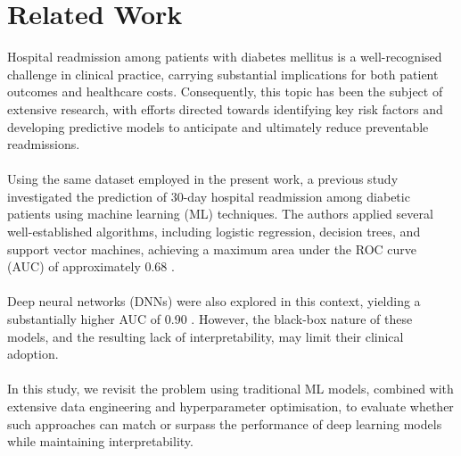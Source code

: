 \section{Related Work}

Hospital readmission among patients with diabetes mellitus is a well-recognised challenge in clinical practice, carrying substantial implications for both patient outcomes and healthcare costs. Consequently, this topic has been the subject of extensive research, with efforts directed towards identifying key risk factors and developing predictive models to anticipate and ultimately reduce preventable readmissions.\\\\
Using the same dataset employed in the present work, a previous study investigated the prediction of 30-day hospital readmission among diabetic patients using machine learning (ML) techniques. The authors applied several well-established algorithms, including logistic regression, decision trees, and support vector machines, achieving a maximum area under the ROC curve (AUC) of approximately 0.68 \cite{shang202130}.\\\\
Deep neural networks (DNNs) were also explored in this context, yielding a substantially higher AUC of 0.90 \cite{hammoudeh2018predicting}. However, the black-box nature of these models, and the resulting lack of interpretability, may limit their clinical adoption.\\\\
In this study, we revisit the problem using traditional ML models, combined with extensive data engineering and hyperparameter optimisation, to evaluate whether such approaches can match or surpass the performance of deep learning models while maintaining interpretability.
